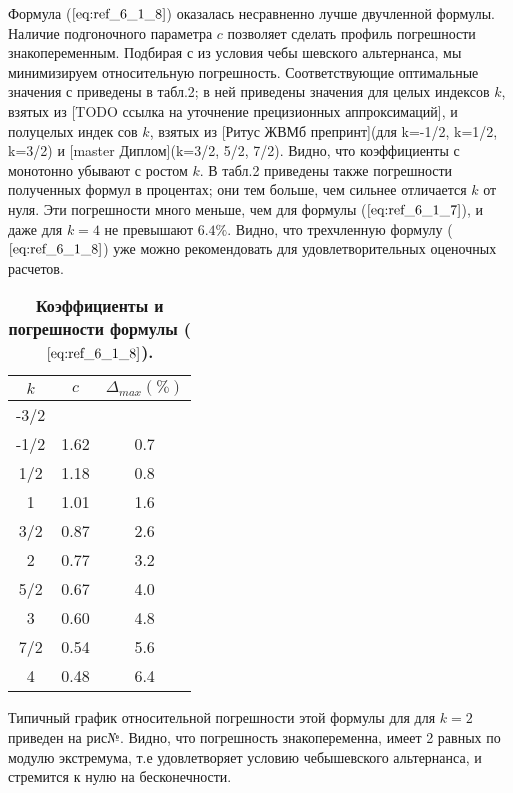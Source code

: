 Формула ($\ref{eq:ref_6_1_8}$) оказалась несравненно лучше двучленной формулы. Наличие подгоночного параметра $c$ 
позволяет сделать профиль погрешности знакопеременным. Подбирая $с$ из условия чебы
шевского альтернанса, мы минимизируем относительную погрешность. Соответствующие оптимальные
значения $с$ приведены в табл.2; в ней приведены значения для целых индексов $k$,
взятых из [TODO ссылка на уточнение прецизионных аппроксимаций], и полуцелых индек
сов $k$, взятых из [Ритус ЖВМб препринт](для k=-1/2, k=1/2, k=3/2) и [master Диплом](k=3/2, 5/2, 7/2). Видно, что коэффициенты $с$ монотонно убывают с ростом $k$. В
табл.2 приведены также погрешности полученных формул в процентах; они тем больше,
чем сильнее отличается $k$ от нуля. Эти погрешности много меньше, чем для формулы
($\ref{eq:ref_6_1_7}$), и даже для $k=4$ не превышают $6.4\%$. Видно, что трехчленную формулу ($\ref{eq:ref_6_1_8}$) уже можно рекомендовать для удовлетворительных оценочных расчетов. 

\begin{table}[]
\caption{\textbf{Коэффициенты и погрешности формулы ($\ref{eq:ref_6_1_8}$).}}
\begin{center}
\begin{tabular}{|c|c|c|}
\hline
$k$ & $c$ & $\Delta_{max} (\%)$ \\
\hline
-3/2 & & \\
-1/2 & 1.62 & 0.7 \\
 1/2 & 1.18 & 0.8 \\
 1   & 1.01 & 1.6 \\
 3/2 & 0.87 & 2.6 \\
  2  & 0.77 & 3.2 \\
 5/2 & 0.67 & 4.0 \\
  3  & 0.60 & 4.8 \\
 7/2 & 0.54 & 5.6 \\
  4  & 0.48 & 6.4 \\
\hline
\end{tabular}
\end{center}
\end{table}

Типичный график относительной погрешности этой формулы для для $k = 2$ приведен на рис№. Видно, что погрешность знакопеременна, имеет 2 равных по модулю экстремума, т.е удовлетворяет условию чебышевского альтернанса, и стремится к нулю на бесконечности.
\\

